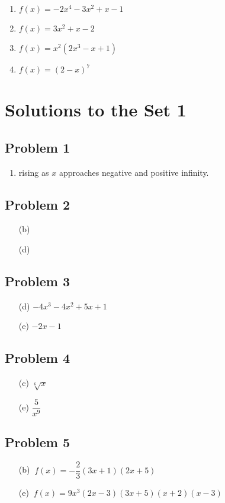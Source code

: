 \documentclass[12pt]{article}
\begin{document}
    \begin{enumerate}[label=(\alph*)]
    \item $f(x) = -2x^4 - 3x^2 + x - 1$
    \item $f(x) = 3x^2 + x - 2$
    \item $f(x) = x^2 \left( 2x^3 - x + 1 \right)$
    \item $f(x) = (2 - x)^7$
    \end{enumerate}

\newpage
\section*{Solutions to the Set 1}
\subsection*{Problem 1}
\begin{enumerate}[label=(\alph*)]
    \item rising as $x$ approaches negative and positive infinity.
\end{enumerate}
\subsection*{Problem 2}
\begin{enumerate}
    \item[(b)]
    \item[(d)]
\end{enumerate}
\subsection*{Problem 3}
\begin{enumerate}
    \item[(d)] \(-4x^3-4x^2+5x+1\)
    \item[(e)] \(-2x-1\) 
\end{enumerate}
\subsection*{Problem 4}
\begin{enumerate}
        \item[(c)] \(\sqrt[6]{x}\)
        \item[(e)] \(\dfrac{5}{x^9}\)
\end{enumerate}
\subsection*{Problem 5}
\begin{enumerate}
    \item[(b)] $\ f(x) = -\dfrac{2}{3}(3x + 1)(2x + 5)$
    \item[(e)] $\ f(x) = 9x^3(2x - 3)(3x + 5)(x + 2)(x - 3)$
\end{enumerate}
\end{document}
